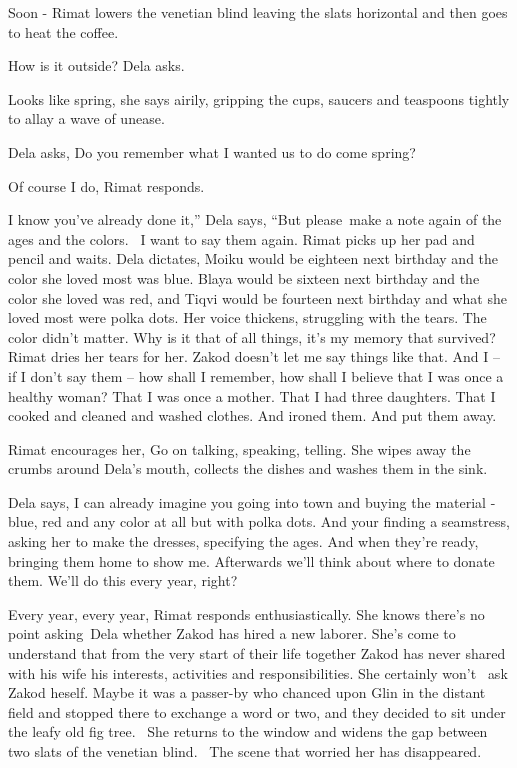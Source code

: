 \documentclass[12pt]{book}
\begin{document}
{\textquotedbl}Soon -{\textquotedbl} Rimat lowers the venetian blind leaving the slats horizontal and then goes to heat
the coffee.

{\textquotedbl}How is it outside?{\textquotedbl} Dela asks.

{\textquotedbl}Looks like spring,{\textquotedbl} she says airily, gripping the cups, saucers and teaspoons tightly to
allay a wave of unease.

Dela asks, {\textquotedbl}Do you remember what I wanted us to do come spring?{\textquotedbl}

{\textquotedbl}Of course I do,{\textquotedbl} Rimat responds.

{\textquotedbl}I know you've already done it,'' Dela says, ``But please~make a note again of the ages and the colors. ~I
want to say them again.{\textquotedbl} Rimat picks up her pad and pencil and waits. Dela dictates, {\textquotedbl}Moiku
would be eighteen next birthday and the color she loved most was blue. Blaya would be sixteen next birthday and the
color she loved was red, and Tiqvi would be fourteen next birthday and what she loved most were polka
dots.{\textquotedbl} Her voice thickens, struggling with the tears. {\textquotedbl}The color didn't matter. Why is it
that of all things, it's my memory that survived?{\textquotedbl} Rimat dries her tears for her. {\textquotedbl}Zakod
doesn't let me say things like that. And I -- if I don't say them -- how shall I remember, how shall I believe that I
was once a healthy woman? That I was once a mother. That I had three daughters. That I cooked and cleaned and washed
clothes. And ironed them. And put them away.{\textquotedbl}

Rimat encourages her, {\textquotedbl}Go on talking, speaking, telling.{\textquotedbl} She wipes away the crumbs around
Dela's mouth, collects the dishes and washes them in the sink.

Dela says, {\textquotedbl}I can already imagine you going into town and buying the material - blue, red and any color at
all but with polka dots. And your finding a seamstress, asking her to make the dresses, specifying the ages. And when
they're ready, bringing them home to show me. Afterwards we'll think about where to donate them. We'll do this every
year, right?{\textquotedbl}

{\textquotedbl}Every year, every year,{\textquotedbl} Rimat responds enthusiastically. She knows there's no point
asking~Dela whether Zakod has hired a new laborer. She's come to understand that from the very start of their life
together Zakod has never shared with his wife his interests, activities and responsibilities{. }She
certainly won't {\ }ask Zakod heself. Maybe it was a passer-by who chanced upon Glin in the distant
field and stopped there to exchange a word or two, and they decided to sit under the{ }leafy old fig
tree. ~She returns to the window and widens the gap between two slats of the venetian blind. ~The scene that worried
her has disappeared.
\end{document}
